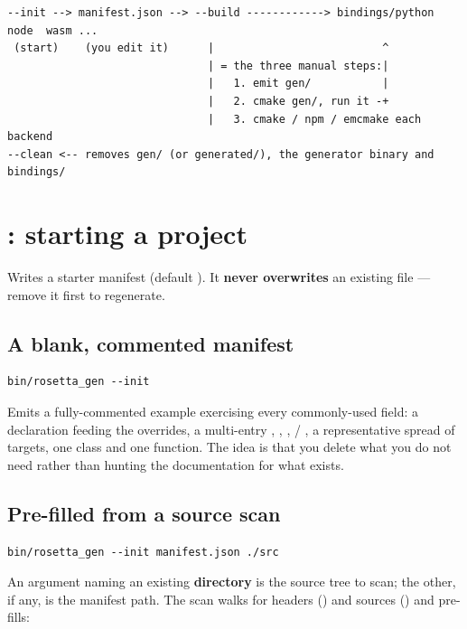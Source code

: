 \begin{lstlisting}[style=plain]
--init --> manifest.json --> --build ------------> bindings/python  node  wasm ...
 (start)    (you edit it)      |                          ^
                               | = the three manual steps:|
                               |   1. emit gen/           |
                               |   2. cmake gen/, run it -+
                               |   3. cmake / npm / emcmake each backend
--clean <-- removes gen/ (or generated/), the generator binary and bindings/
\end{lstlisting}

\section{: starting a project}
\label{sec:init}

Writes a starter manifest (default ). It \textbf{never
overwrites} an existing file --- remove it first to regenerate.

\subsection*{A blank, commented manifest}

\begin{lstlisting}[style=sh]
bin/rosetta_gen --init
\end{lstlisting}

Emits a fully-commented example exercising every commonly-used field: a
 declaration feeding the  overrides, a
multi-entry , ,
,  / , a
representative spread of targets, one class and one function. The idea is that
you delete what you do not need rather than hunting the documentation for what
exists.

\subsection*{Pre-filled from a source scan}

\begin{lstlisting}[style=sh]
bin/rosetta_gen --init manifest.json ./src
\end{lstlisting}

An argument naming an existing \textbf{directory} is the source tree to scan;
the other, if any, is the manifest path. The scan walks for headers
() and sources () and pre-fills:

